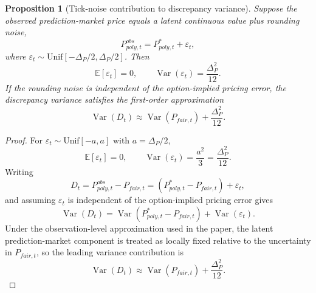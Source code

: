 \documentclass[11pt]{article}
\numberwithin{equation}{section}
\theoremstyle{plain}
\newtheorem{proposition}{Proposition}[section]
\begin{document}
\begin{proposition}[Tick-noise contribution to discrepancy variance]
\label{prop:tick-noise}
Suppose the observed prediction-market price equals a latent continuous value plus rounding noise,
\[
P_{poly,t}^{obs}=P_{poly,t}^{\ast}+\varepsilon_t,
\]
where $\varepsilon_t\sim \mathrm{Unif}[-\Delta_P/2,\Delta_P/2]$. Then
\[
\mathbb{E}[\varepsilon_t]=0,
\qquad
\operatorname{Var}(\varepsilon_t)=\frac{\Delta_P^2}{12}.
\]
If the rounding noise is independent of the option-implied pricing error, the discrepancy variance satisfies the first-order approximation
\[
\operatorname{Var}(D_t)
\approx
\operatorname{Var}(P_{fair,t})+\frac{\Delta_P^2}{12}.
\]
\end{proposition}

\begin{proof}
For $\varepsilon_t\sim \mathrm{Unif}[-a,a]$ with $a=\Delta_P/2$,
\[
\mathbb{E}[\varepsilon_t]=0,
\qquad
\operatorname{Var}(\varepsilon_t)=\frac{a^2}{3}=\frac{\Delta_P^2}{12}.
\]
Writing
\[
D_t=P_{poly,t}^{obs}-P_{fair,t}
=
\left(P_{poly,t}^{\ast}-P_{fair,t}\right)+\varepsilon_t,
\]
and assuming $\varepsilon_t$ is independent of the option-implied pricing error gives
\[
\operatorname{Var}(D_t)
=
\operatorname{Var}(P_{poly,t}^{\ast}-P_{fair,t})+\operatorname{Var}(\varepsilon_t).
\]
Under the observation-level approximation used in the paper, the latent prediction-market component is treated as locally fixed relative to the uncertainty in $P_{fair,t}$, so the leading variance contribution is
\[
\operatorname{Var}(D_t)\approx \operatorname{Var}(P_{fair,t})+\frac{\Delta_P^2}{12}.
\]
\end{proof}



\end{document}
